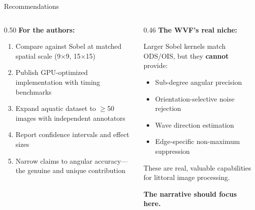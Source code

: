 \documentclass[10pt, aspectratio=169]{beamer}
\begin{document}
\begin{frame}{Recommendations}
  \begin{columns}[T]
    \begin{column}{0.50\textwidth}
      \textbf{For the authors:}
      \vspace{0.3em}
      \begin{enumerate}
        \item Compare against Sobel at matched spatial scale (9$\times$9, 15$\times$15)
        \item Publish GPU-optimized implementation with timing benchmarks
        \item Expand aquatic dataset to $\geq$50 images with independent annotators
        \item Report confidence intervals and effect sizes
        \item Narrow claims to angular accuracy---the genuine and unique contribution
      \end{enumerate}
    \end{column}
    \begin{column}{0.46\textwidth}
      \textbf{The WVF's real niche:}
      \vspace{0.3em}

      Larger Sobel kernels match ODS/OIS, but they \textbf{cannot} provide:
      \begin{itemize}
        \item Sub-degree angular precision
        \item Orientation-selective noise rejection
        \item Wave direction estimation
        \item Edge-specific non-maximum suppression
      \end{itemize}

      \vspace{0.5em}
      These are real, valuable capabilities for littoral image processing.

      \vspace{0.3em}
      \textbf{The narrative should focus here.}
    \end{column}
  \end{columns}
\end{frame}
\end{document}
